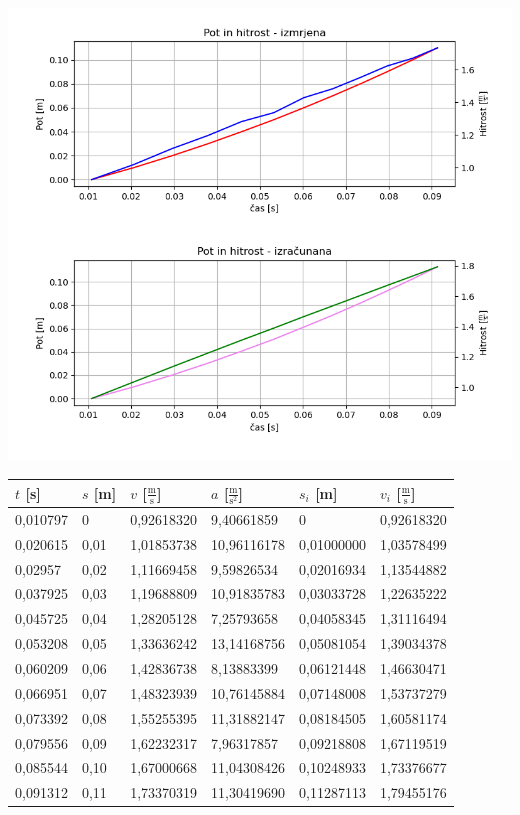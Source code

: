 \documentclass[12pt]{article}
\begin{document}
	\includegraphics[width=\linewidth]{slike/graf_v2_1.png}

	\begin{table}[h!]
		\centering
		\begin{tabular}{|l|l|l|l|l|l|}
		\hline
		$t$ [s] 	& $s$ [m] 	& $v$ [$\frac{\text{m}}{\text{s}}$] & $a$ [$\frac{\text{m}}{\text{s}^2}$] 	& $s_i$ [m] 	& $v_i$ [$\frac{\text{m}}{\text{s}}$] 	\\ \hline
		0,010797	& 0			& 0,92618320						&  9,40661859							& 0				& 0,92618320							\\ \hline
		0,020615	& 0,01		& 1,01853738						& 10,96116178							& 0,01000000	& 1,03578499							\\ \hline
		0,02957		& 0,02		& 1,11669458						&  9,59826534							& 0,02016934	& 1,13544882							\\ \hline
		0,037925	& 0,03		& 1,19688809						& 10,91835783							& 0,03033728	& 1,22635222							\\ \hline
		0,045725	& 0,04		& 1,28205128						&  7,25793658							& 0,04058345	& 1,31116494							\\ \hline
		0,053208	& 0,05		& 1,33636242						& 13,14168756							& 0,05081054	& 1,39034378							\\ \hline
		0,060209	& 0,06		& 1,42836738						&  8,13883399							& 0,06121448	& 1,46630471							\\ \hline
		0,066951	& 0,07		& 1,48323939						& 10,76145884							& 0,07148008	& 1,53737279							\\ \hline
		0,073392	& 0,08		& 1,55255395						& 11,31882147							& 0,08184505	& 1,60581174							\\ \hline
		0,079556	& 0,09		& 1,62232317						&  7,96317857							& 0,09218808	& 1,67119519							\\ \hline
		0,085544	& 0,10		& 1,67000668						& 11,04308426							& 0,10248933	& 1,73376677							\\ \hline
		0,091312	& 0,11		& 1,73370319						& 11,30419690							& 0,11287113	& 1,79455176							\\ \hline
		\end{tabular}
	\end{table}
\end{document}
